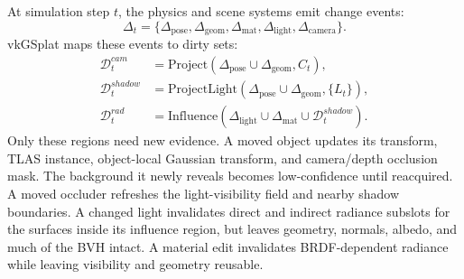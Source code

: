 \documentclass[10pt,journal,onecolumn]{IEEEtran}
\begin{document}
At simulation step $t$, the physics and scene systems emit change events:
\[
\Delta_t =
\{\Delta_{\mathrm{pose}}, \Delta_{\mathrm{geom}}, \Delta_{\mathrm{mat}},
  \Delta_{\mathrm{light}}, \Delta_{\mathrm{camera}}\}.
\]
vkGSplat maps these events to dirty sets:
\begin{align}
  \mathcal{D}^{cam}_t &= \mathrm{Project}(\Delta_{\mathrm{pose}}
      \cup \Delta_{\mathrm{geom}}, C_t),\\
  \mathcal{D}^{shadow}_t &= \mathrm{ProjectLight}(\Delta_{\mathrm{pose}}
      \cup \Delta_{\mathrm{geom}}, \{L_t\}),\\
  \mathcal{D}^{rad}_t &= \mathrm{Influence}(\Delta_{\mathrm{light}}
      \cup \Delta_{\mathrm{mat}} \cup \mathcal{D}^{shadow}_t).
\end{align}
Only these regions need new evidence. A moved object updates its transform, TLAS
instance, object-local Gaussian transform, and camera/depth occlusion mask. The
background it newly reveals becomes low-confidence until reacquired. A moved
occluder refreshes the light-visibility field and nearby shadow boundaries. A
changed light invalidates direct and indirect radiance subslots for the surfaces
inside its influence region, but leaves geometry, normals, albedo, and much of
the BVH intact. A material edit invalidates BRDF-dependent radiance while
leaving visibility and geometry reusable.
\end{document}

